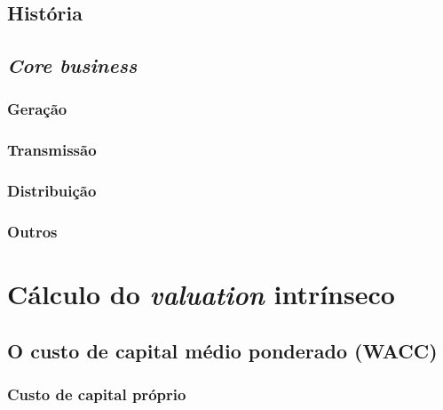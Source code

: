 \documentclass[grad,numbers]{coppe}
\begin{document}
  \hypertarget{histuxf3ria}{%
  \subsection{História}\label{histuxf3ria}}
  
  \hypertarget{core-business}{%
  \subsection{\texorpdfstring{\emph{Core business}}{Core business}}\label{core-business}}
  
  \hypertarget{gerauxe7uxe3o-1}{%
  \subsubsection{Geração}\label{gerauxe7uxe3o-1}}
  
  \hypertarget{transmissuxe3o-1}{%
  \subsubsection{Transmissão}\label{transmissuxe3o-1}}
  
  \hypertarget{distribuiuxe7uxe3o-1}{%
  \subsubsection{Distribuição}\label{distribuiuxe7uxe3o-1}}
  
  \hypertarget{outros}{%
  \subsubsection{Outros}\label{outros}}
  
  \hypertarget{cuxe1lculo-do-valuation-intruxednseco}{%
  \section{\texorpdfstring{Cálculo do \emph{valuation} intrínseco}{Cálculo do valuation intrínseco}}\label{cuxe1lculo-do-valuation-intruxednseco}}
  
  \hypertarget{o-custo-de-capital-muxe9dio-ponderado-wacc}{%
  \subsection{O custo de capital médio ponderado (WACC)}\label{o-custo-de-capital-muxe9dio-ponderado-wacc}}
  
  \hypertarget{custo-de-capital-pruxf3prio}{%
  \subsubsection{Custo de capital próprio}\label{custo-de-capital-pruxf3prio}}
  
\end{document}
